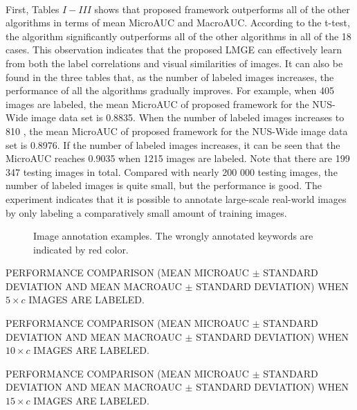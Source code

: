 \documentclass[a4paper,11pt]{report}
\begin{document}
\paragraph{}
First,  Tables $ I - III $  shows that proposed framework  outperforms all of the other algorithms in
terms of mean MicroAUC and MacroAUC. According to the
t-test, the algorithm significantly outperforms all of the other
algorithms in all of the 18 cases. This observation indicates that
the proposed LMGE can effectively learn from both the label
correlations and visual similarities of images.
It can also be found in the three tables that, as the number
of labeled images increases, the performance of all the algorithms
gradually improves. For example, when 405 images
are labeled, the mean MicroAUC of proposed framework for the NUS-Wide image data set is 0.8835. When the number of labeled
images increases to 810 , the mean MicroAUC
of proposed  framework for the NUS-Wide image data set is 0.8976.
If  the number of labeled images increases, it
can be seen that the MicroAUC reaches 0.9035 when 1215
images are labeled. Note that there are 199 347 testing images
in total. Compared with nearly 200 000 testing images, the
number of labeled images is quite small, but the performance
is good. The experiment indicates that it is possible to annotate
large-scale real-world images by only labeling a comparatively
small amount of training images.
\begin{figure} [ht]
 \centering

\caption{Image annotation examples. The wrongly annotated keywords are indicated by red color.}
\end{figure}
\begin{table}[H]
\centering
\tiny\caption{PERFORMANCE COMPARISON (MEAN MICROAUC $\pm$ STANDARD DEVIATION AND MEAN MACROAUC $\pm$ STANDARD DEVIATION) WHEN $5\times c$ IMAGES ARE
LABELED. }

\end{table}

\begin{table}[H]
\centering
\tiny\caption{PERFORMANCE COMPARISON (MEAN MICROAUC $\pm$ STANDARD DEVIATION AND MEAN MACROAUC $\pm$ STANDARD DEVIATION) WHEN $10\times c$ IMAGES ARE
LABELED. }

\end{table}
\begin{table}[H]
\centering
\tiny\caption{PERFORMANCE COMPARISON (MEAN MICROAUC $\pm$ STANDARD DEVIATION AND MEAN MACROAUC $\pm$ STANDARD DEVIATION) WHEN $15\times c$ IMAGES ARE
LABELED. }

\end{table}
\end{document}
